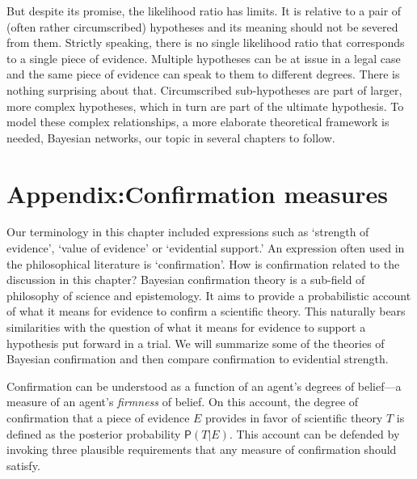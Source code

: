 \documentclass[
  letterpaper,
  DIV=11,
  numbers=noendperiod]{scrartcl}
\newcommand{\pr}[1]{\mathsf{P}(#1)}
\begin{document}
But despite its promise, the likelihood ratio has limits. It is relative
to a pair of (often rather circumscribed) hypotheses and its meaning
should not be severed from them. Strictly speaking, there is no single
likelihood ratio that corresponds to a single piece of evidence.
Multiple hypotheses can be at issue in a legal case and the same piece
of evidence can speak to them to different degrees. There is nothing
surprising about that. Circumscribed sub-hypotheses are part of larger,
more complex hypotheses, which in turn are part of the ultimate
hypothesis. To model these complex relationships, a more elaborate
theoretical framework is needed, Bayesian networks, our topic in several
chapters to follow.

\appendix


\hypertarget{appendixconfirmation-measures}{%
\section{\texorpdfstring{Appendix:Confirmation measures
\label{sec:confirmation}}{Appendix:Confirmation measures }}\label{appendixconfirmation-measures}}

Our terminology in this chapter included expressions such as `strength
of evidence', `value of evidence' or `evidential support.' An expression
often used in the philosophical literature is `confirmation'. How is
confirmation related to the discussion in this chapter? Bayesian
confirmation theory is a sub-field of philosophy of science and
epistemology. It aims to provide a probabilistic account of what it
means for evidence to confirm a scientific theory. This naturally bears
similarities with the question of what it means for evidence to support
a hypothesis put forward in a trial. We will summarize some of the
theories of Bayesian confirmation and then compare confirmation to
evidential strength.

Confirmation can be understood as a function of an agent's degrees of
belief---a measure of an agent's \textit{firmness} of belief. On this
account, the degree of confirmation that a piece of evidence \(E\)
provides in favor of scientific theory \(T\) is defined as the posterior
probability \(\pr{T \vert E}\). This account can be defended by invoking
three plausible requirements that any measure of confirmation should
satisfy.
\end{document}
